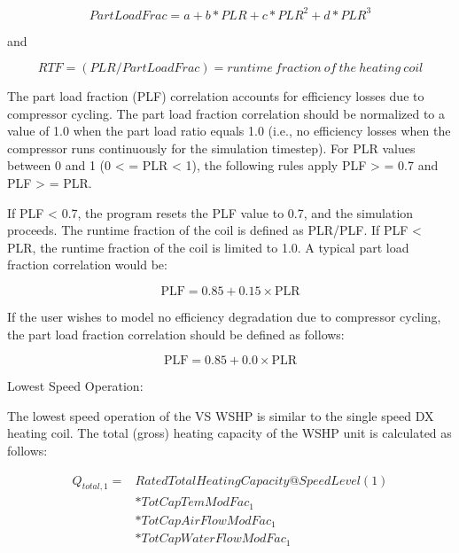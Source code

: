 \begin{equation}
PartLoadFrac = a + b*PLR + c*PL{R^2} + d*PL{R^3}
\end{equation}

and

\begin{equation}
RTF = (PLR/PartLoadFrac) = runtime~fraction~of~the~heating~coil
\end{equation}

The part load fraction (PLF) correlation accounts for efficiency losses due to compressor cycling. The part load fraction correlation should be normalized to a value of 1.0 when the part load ratio equals 1.0 (i.e., no efficiency losses when the compressor runs continuously for the simulation timestep). For PLR values between 0 and 1 (0 \textless{} = PLR \textless{} 1), the following rules apply PLF \textgreater{} = 0.7 and PLF \textgreater{} = PLR.

If PLF \textless{} 0.7, the program resets the PLF value to 0.7, and the simulation proceeds. The runtime fraction of the coil is defined as PLR/PLF. If PLF \textless{} PLR, the runtime fraction of the coil is limited to 1.0. A typical part load fraction correlation would be:

\begin{equation}
{\mathrm{PLF}} = 0.85 + 0.15 \times {\mathrm{PLR}}
\end{equation}

If the user wishes to model no efficiency degradation due to compressor cycling, the part load fraction correlation should be defined as follows:

\begin{equation}
{\mathrm{PLF}} = 0.85 + 0.0 \times {\mathrm{PLR}}
\end{equation}

Lowest Speed Operation:

The lowest speed operation of the VS WSHP is similar to the single speed DX heating coil. The total (gross) heating capacity of the WSHP unit is calculated as follows:

\begin{equation}
\begin{array}{rl}
{Q_{total,1}} =& RatedTotalHeatingCapacity@SpeedLevel\left( 1 \right) \\
               &*TotCapTemModFa{c_1} \\
               &*TotCapAirFlowModFa{c_1} \\
               &*TotCapWaterFlowModFa{c_1}
\end{array}
\end{equation}


